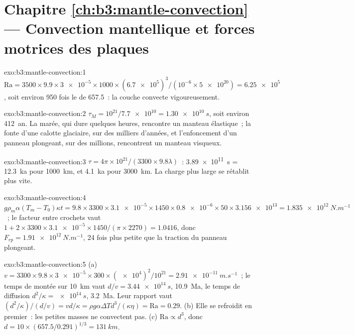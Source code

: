 \section*{Chapitre \ref{ch:b3:mantle-convection} --- Convection mantellique et forces motrices des plaques}

\begin{solution}{exo:b3:mantle-convection:1}
$\mathrm{Ra} = 3500\times9.9\times\num{3e-5}\times1000\times(\num{6.7e5})^3/
(10^{-6}\times\num{5e20}) = \num{6.25e5}$, soit environ 950 fois le  de 657.5~: la couche convecte vigoureusement.
\end{solution}

\begin{solution}{exo:b3:mantle-convection:2}
$\tau_M = 10^{21}/\num{7.7e10} = \qty{1.30e10}{s}$, soit environ \qty{412}{an}. La
marée, qui dure quelques heures, rencontre un manteau élastique~; la fonte d'une calotte glaciaire,
sur des milliers d'années, et l'enfoncement d'un panneau plongeant, sur des millions, rencontrent un
manteau visqueux.
\end{solution}

\begin{solution}{exo:b3:mantle-convection:3}
$\tau = 4\pi\times10^{21}/(3300\times9.8\lambda)$~: \qty{3.89e11}{s} =
\qty{12.3}{ka} pour \qty{1000}{km}, et \qty{4.1}{ka} pour \qty{3000}{km}. La
charge plus large se rétablit plus vite.
\end{solution}

\begin{solution}{exo:b3:mantle-convection:4}
$g\rho_m\alpha(T_m - T_0)\kappa t = 9.8\times3300\times\num{3.1e-5}\times1450
\times\num{0.8e-6}\times50\times\num{3.156e13} = \qty{1.835e12}{N.m^{-1}}$~; le
facteur entre crochets vaut $1 + 2\times3300\times\num{3.1e-5}\times1450/(\pi\times2270) = 1.0416$,
donc $F_{rp} = \qty{1.91e12}{N.m^{-1}}$, 24 fois plus petite que la traction du panneau plongeant.
\end{solution}

\begin{solution}{exo:b3:mantle-convection:5}
(a) $v = 3300\times9.8\times\num{3e-5}\times300\times(\num{e4})^2/10^{21} =
\qty{2.91e-11}{m.s^{-1}}$~; le temps de montée sur \qty{10}{km} vaut $d/v =
\qty{3.44e14}{s}$, \qty{10.9}{Ma}, le temps de diffusion $d^2/\kappa =
\qty{e14}{s}$, \qty{3.2}{Ma}. Leur rapport vaut $(d^2/\kappa)/(d/v) =
vd/\kappa = \rho g\alpha\Delta Td^3/(\kappa\eta) = \mathrm{Ra} = 0.29$. (b) Elle
se refroidit en premier~: les petites masses ne convectent pas. (c) $\mathrm{Ra} \propto d^3$, donc $d =
10\times(657.5/0.291)^{1/3} = \qty{131}{km}$.
\end{solution}

